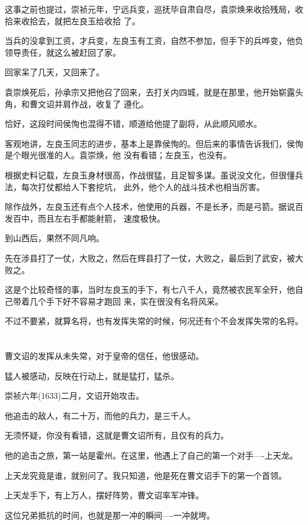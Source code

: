 \documentclass[11pt,a4paper,onecolumn]{article}
\begin{document}
这事之前也提过，崇祯元年，宁远兵变，巡抚毕自肃自尽，袁崇焕来收拾残局，收拾来收拾去，就把左良玉给收拾
了。

当兵的没拿到工资，才兵变，左良玉有工资，自然不参加，但手下的兵哗变，他负领导责任，就这么被赶回了家。

回家呆了几天，又回来了。

袁崇焕死后，孙承宗又把他召了回来，去打关内四城，就是在那里，他开始崭露头角，和曹文诏并肩作战，收复了
遵化。

恰好，这段时间侯恂也混得不错，顺道给他提了副将，从此顺风顺水。

客观地讲，左良玉同志的进步，基本上是靠侯恂的。但后来的事情告诉我们，侯恂是个眼光很准的人。袁崇焕，他
没有看错；左良玉，也没有。

根据史料记载，左良玉身材很高，作战很猛，且足智多谋。虽说没文化，但很懂兵法，每次打仗都给人下套挖坑，
此外，他个人的战斗技术也相当厉害。

除作战外，左良玉还有点个人技术，他使用的兵器，不是长矛，而是弓箭。据说百发百中，而且左右手都能射箭，
速度极快。

到山西后，果然不同凡响。

先在涉县打了一仗，大败之，然后在辉县打了一仗，大败之，最后到了武安，被大败之。

这是个比较奇怪的事，当时左良玉的手下，有七八千人，竟然被农民军全歼，他自己带着几个手下好不容易才跑回
来，实在很没有名将风采。

不过不要紧，就算名将，也有发挥失常的时候，何况还有个不会发挥失常的名将。

\section[\thesection]{}

曹文诏的发挥从未失常，对于皇帝的信任，他很感动。

猛人被感动，反映在行动上，就是猛打，猛杀。

崇祯六年(1633)二月，文诏开始攻击。

他追击的敌人，有二十万，而他的兵力，是三千人。

无须怀疑，你没有看错，这就是曹文诏所有，且仅有的兵力。

他的追击之旅，第一站是霍州。在这里，他遇上了自己的第一个对手----上天龙。

上天龙究竟是谁，就别问了。我只知道，他是死在曹文诏手下的第一个首领。

上天龙手下，有上万人，摆好阵势，曹文诏率军冲锋。

这位兄弟抵抗的时间，也就是那一冲的瞬间----一冲就垮。
\end{document}

